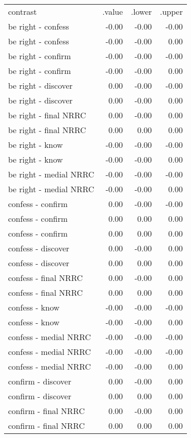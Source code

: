 \begin{longtable}{lrrr}
 contrast & .value & .lower & .upper \\ 
 be right - confess & -0.00 & -0.00 & -0.00 \\ 
  be right - confess & -0.00 & -0.00 & 0.00 \\ 
  be right - confirm & -0.00 & -0.00 & -0.00 \\ 
  be right - confirm & -0.00 & -0.00 & 0.00 \\ 
  be right - discover & 0.00 & -0.00 & -0.00 \\ 
  be right - discover & 0.00 & -0.00 & 0.00 \\ 
  be right - final NRRC & 0.00 & -0.00 & 0.00 \\ 
  be right - final NRRC & 0.00 & 0.00 & 0.00 \\ 
  be right - know & -0.00 & -0.00 & -0.00 \\ 
  be right - know & -0.00 & -0.00 & 0.00 \\ 
  be right - medial NRRC & -0.00 & -0.00 & -0.00 \\ 
  be right - medial NRRC & -0.00 & -0.00 & 0.00 \\ 
  confess - confirm & 0.00 & -0.00 & -0.00 \\ 
  confess - confirm & 0.00 & 0.00 & 0.00 \\ 
  confess - confirm & 0.00 & 0.00 & 0.00 \\ 
  confess - discover & 0.00 & -0.00 & 0.00 \\ 
  confess - discover & 0.00 & 0.00 & 0.00 \\ 
  confess - final NRRC & 0.00 & -0.00 & 0.00 \\ 
  confess - final NRRC & 0.00 & 0.00 & 0.00 \\ 
  confess - know & -0.00 & -0.00 & -0.00 \\ 
  confess - know & -0.00 & -0.00 & 0.00 \\ 
  confess - medial NRRC & -0.00 & -0.00 & -0.00 \\ 
  confess - medial NRRC & -0.00 & -0.00 & -0.00 \\ 
  confess - medial NRRC & -0.00 & -0.00 & 0.00 \\ 
  confirm - discover & 0.00 & -0.00 & 0.00 \\ 
  confirm - discover & 0.00 & 0.00 & 0.00 \\ 
  confirm - final NRRC & 0.00 & -0.00 & 0.00 \\ 
  confirm - final NRRC & 0.00 & 0.00 & 0.00 \\ 

\end{longtable}
